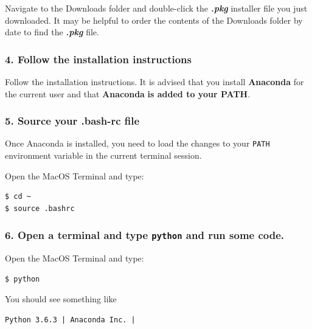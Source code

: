 \documentclass{book}
\begin{document}
Navigate to the Downloads folder and double-click the
\textbf{\emph{.pkg}} installer file you just downloaded. It may be
helpful to order the contents of the Downloads folder by date to find
the \textbf{\emph{.pkg}} file.
    




    
        \subsubsection{4. Follow the installation
instructions}\label{follow-the-installation-instructions}

Follow the installation instructions. It is advised that you install
\textbf{Anaconda} for the current user and that \textbf{Anaconda}
\textbf{is added to your PATH}.
    




    
        \subsubsection{5. Source your .bash-rc
file}\label{source-your-.bash-rc-file}

Once Anaconda is installed, you need to load the changes to your
\lstinline!PATH! environment variable in the current terminal session.

Open the MacOS Terminal and type:

\begin{lstlisting}
$ cd ~
$ source .bashrc
\end{lstlisting}
    




    
        \subsubsection{\texorpdfstring{6. Open a terminal and type
\texttt{python} and run some
code.}{6. Open a terminal and type python and run some code.}}\label{open-a-terminal-and-type-python-and-run-some-code.}

Open the MacOS Terminal and type:

\begin{lstlisting}
$ python
\end{lstlisting}

You should see something like

\begin{lstlisting}
Python 3.6.3 | Anaconda Inc. |
\end{lstlisting}
\end{document}
